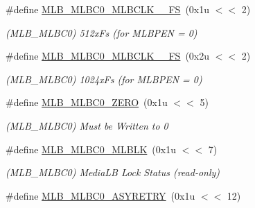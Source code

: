 \begin{DoxyCompactItemize}
\mbox{\label{group__SAMV71__MLB_ga96afdf6878321aeb7d209edfe37cfe57}} 
\#define \mbox{\hyperlink{group__SAMV71__MLB_ga96afdf6878321aeb7d209edfe37cfe57}{M\+L\+B\+\_\+\+M\+L\+B\+C0\+\_\+\+M\+L\+B\+C\+L\+K\+\_\+\_\+\+FS}}~(0x1u $<$$<$ 2)
\begin{DoxyCompactList}\small\item\em (M\+L\+B\+\_\+\+M\+L\+B\+C0) 512x\+Fs (for M\+L\+B\+P\+EN = 0) \end{DoxyCompactList}\item 
\mbox{\label{group__SAMV71__MLB_ga10c07d8751e273e6c4db20e0f18236ab}} 
\#define \mbox{\hyperlink{group__SAMV71__MLB_ga10c07d8751e273e6c4db20e0f18236ab}{M\+L\+B\+\_\+\+M\+L\+B\+C0\+\_\+\+M\+L\+B\+C\+L\+K\+\_\+\_\+\+FS}}~(0x2u $<$$<$ 2)
\begin{DoxyCompactList}\small\item\em (M\+L\+B\+\_\+\+M\+L\+B\+C0) 1024x\+Fs (for M\+L\+B\+P\+EN = 0) \end{DoxyCompactList}\item 
\mbox{\label{group__SAMV71__MLB_ga4e76702ff7e601ef33d4c4020335646d}} 
\#define \mbox{\hyperlink{group__SAMV71__MLB_ga4e76702ff7e601ef33d4c4020335646d}{M\+L\+B\+\_\+\+M\+L\+B\+C0\+\_\+\+Z\+E\+RO}}~(0x1u $<$$<$ 5)
\begin{DoxyCompactList}\small\item\em (M\+L\+B\+\_\+\+M\+L\+B\+C0) Must be Written to 0 \end{DoxyCompactList}\item 
\mbox{\label{group__SAMV71__MLB_ga1897f54744aa156223c962d113fc025f}} 
\#define \mbox{\hyperlink{group__SAMV71__MLB_ga1897f54744aa156223c962d113fc025f}{M\+L\+B\+\_\+\+M\+L\+B\+C0\+\_\+\+M\+L\+B\+LK}}~(0x1u $<$$<$ 7)
\begin{DoxyCompactList}\small\item\em (M\+L\+B\+\_\+\+M\+L\+B\+C0) Media\+LB Lock Status (read-\/only) \end{DoxyCompactList}\item 
\mbox{\label{group__SAMV71__MLB_ga1c8cee7d5ed940e49ebaaa766da73fad}} 
\#define \mbox{\hyperlink{group__SAMV71__MLB_ga1c8cee7d5ed940e49ebaaa766da73fad}{M\+L\+B\+\_\+\+M\+L\+B\+C0\+\_\+\+A\+S\+Y\+R\+E\+T\+RY}}~(0x1u $<$$<$ 12)
$$
\end{DoxyCompactItemize}
